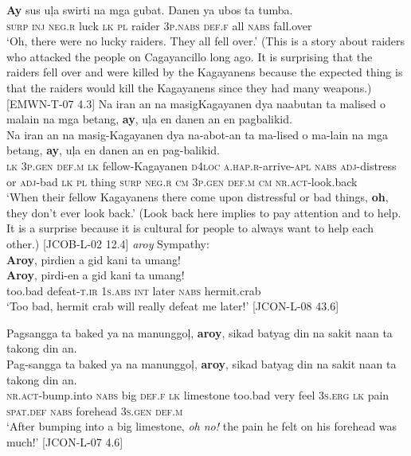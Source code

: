 \gll \textbf{Ay}  sus  uļa  swirti  na  mga  gubat.  Danen  ya  ubos  ta  tumba. \\
\textsc{surp}   \textsc{inj}  \textsc{neg.r}  luck  \textsc{lk}  \textsc{pl}  raider  3\textsc{p.nabs}  \textsc{def.f}  all  \textsc{nabs}  fall.over \\
\glt ‘Oh, there were no lucky raiders. They all fell over.’ (This is a story about raiders who attacked the people on Cagayancillo long ago. It is surprising that the raiders fell over and were killed by the Kagayanens because the expected thing is that the raiders would kill the Kagayanens since they had many weapons.) [EMWN-T-07 4.3]
\z
\ea
\label{bkm:Ref118535037}
Na  iran  an  na  masigKagayanen  dya  naabutan  ta  malised o  malain  na  mga  betang,  \textbf{ay},  uļa  en  danen  an  en  pagbalikid. \\\smallskip
\gll Na  iran  an  na  masig-Kagayanen  dya  na-abot-an  ta  ma-lised o  ma-lain  na  mga  betang,  \textbf{ay},  uļa  en  danen  an  en  pag-balikid. \\
\textsc{lk}  3\textsc{p.gen}  \textsc{def.m}  \textsc{lk}  fellow-Kagayanen  \textsc{d}4\textsc{loc}  \textsc{a.hap.r}-arrive-\textsc{apl}  \textsc{nabs}  \textsc{adj}-distress or  \textsc{adj}-bad  \textsc{lk}  \textsc{pl}  thing  \textsc{surp}  \textsc{neg.r}  \textsc{cm}  3\textsc{p.gen}  \textsc{def.m}  \textsc{cm}  \textsc{nr.act}-look.back \\
\glt `When their fellow Kagayanens there come upon distressful or bad things, \textbf{oh}, they don’t ever look back.’ (Look back here implies to pay attention and to help. It is a surprise because it is cultural for people to always want to help each other.) [JCOB-L-02 12.4]
\z
\ea 
\textit{aroy} Sympathy: \\
\textbf{Aroy},  pirdien  a  gid  kani  ta  umang! \\\smallskip
\gll \textbf{Aroy},  pirdi-en  a  gid  kani  ta  umang! \\
too.bad  defeat-\textsc{t.ir}  1\textsc{s.abs}  \textsc{int}  later  \textsc{nabs}  hermit.crab \\
\glt ‘Too bad, hermit crab will really defeat me later!’\label{bkm:Ref329594828} [JCON-L-08 43.6]
\z

\newpage
\ea
\label{bkm:Ref118535410}
Pagsangga  ta  baked  ya  na  manunggoļ,  \textbf{aroy},  sikad  batyag din  na  sakit  naan  ta  takong  din  an. \\\smallskip
\gll Pag-sangga  ta  baked  ya  na  manunggoļ,  \textbf{aroy},  sikad  batyag din  na  sakit  naan  ta  takong  din  an. \\
\textsc{nr.act}-bump.into  \textsc{nabs}  big  \textsc{def.f}  \textsc{lk}  limestone  too.bad  very  feel
3\textsc{s.erg}  \textsc{lk}  pain  \textsc{spat.def}  \textsc{nabs}  forehead  3\textsc{s.gen}  \textsc{def.m} \\
\glt `After bumping into a big limestone, \textit{oh no!} the pain he felt on his forehead was much!’ [JCON-L-07 4.6]
\z

